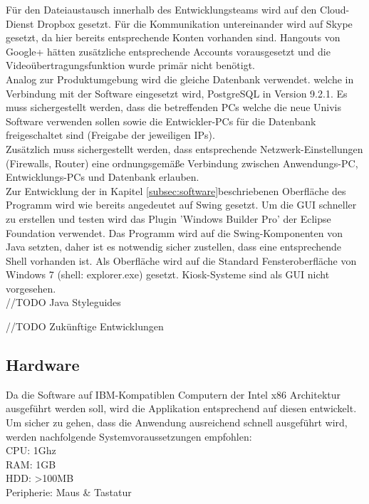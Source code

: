 Für den Dateiaustausch innerhalb des Entwicklungsteams wird auf den Cloud-Dienst Dropbox gesetzt.
Für die Kommunikation untereinander wird auf Skype gesetzt, da hier bereits entsprechende Konten vorhanden sind. Hangouts von Google+ hätten zusätzliche entsprechende Accounts vorausgesetzt und die Videoübertragungsfunktion wurde primär nicht benötigt.\\

Analog zur Produktumgebung wird die gleiche Datenbank verwendet. welche in Verbindung mit der Software eingesetzt wird, PostgreSQL in Version 9.2.1.
Es muss sichergestellt werden, dass die betreffenden PCs welche die neue Univis Software verwenden sollen sowie die Entwickler-PCs für die Datenbank freigeschaltet sind (Freigabe der jeweiligen IPs).\\

Zusätzlich muss sichergestellt werden, dass entsprechende Netzwerk-Einstellungen (Firewalls, Router) eine ordnungsgemäße Verbindung zwischen Anwendungs-PC, Entwicklungs-PCs und Datenbank erlauben.\\

Zur Entwicklung der in Kapitel \ref{subsec:software}beschriebenen Oberfläche des Programm wird wie bereits angedeutet auf Swing gesetzt. Um die GUI schneller zu erstellen und testen wird das Plugin 'Windows Builder Pro' der Eclipse Foundation verwendet.
Das Programm wird auf die Swing-Komponenten von Java setzten, daher ist es notwendig sicher zustellen, dass eine entsprechende Shell vorhanden ist.
Als Oberfläche wird auf die Standard Fensteroberfläche von Windows 7 (shell: explorer.exe) gesetzt. Kiosk-Systeme sind als GUI nicht vorgesehen. \\

//TODO Java Styleguides

//TODO Zukünftige Entwicklungen

\subsection{Hardware}
\label{subsec:devhardware}

Da die Software auf IBM-Kompatiblen Computern der Intel x86 Architektur ausgeführt werden soll, wird die Applikation entsprechend auf diesen entwickelt.
Um sicher zu gehen, dass die Anwendung ausreichend schnell ausgeführt wird, werden nachfolgende Systemvoraussetzungen empfohlen:\\

CPU: 1Ghz\\
RAM: 1GB\\
HDD: >100MB\\
Peripherie: Maus \& Tastatur\\

